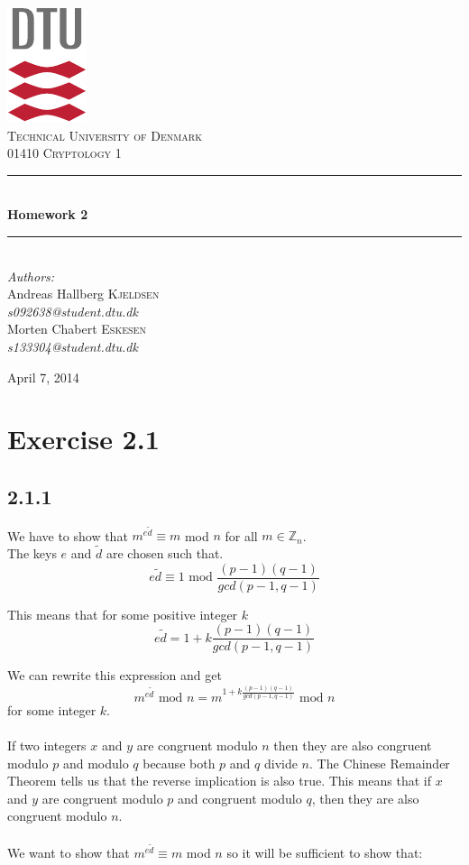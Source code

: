 \documentclass[11pt]{report}
\newcommand{\HRule}{\rule{\linewidth}{0.5mm}}
\begin{document}
\begin{titlepage}
\begin{center}

\includegraphics[scale=2.0]{../GFX/dtu_logo.pdf}\\[1cm]
\textsc{\LARGE Technical University of Denmark}\\[1.5cm]
\textsc{\Large 01410 Cryptology 1}\\[0.5cm]

\HRule \\[0.4cm]
{\huge \bfseries Homework 2}\\[0.1cm]
\HRule \\[1.5cm]

{\large
\emph{Authors:} \\[10pt]
Andreas Hallberg \textsc{Kjeldsen}\\
\emph{s092638@student.dtu.dk} \\[10pt]
Morten Chabert \textsc{Eskesen}\\
\emph{s133304@student.dtu.dk}
}
\vfill

{\large April 7, 2014}

\end{center}
\end{titlepage}

\section*{Exercise 2.1}
\subsection*{2.1.1}
We have to show that $m^{e\tilde{d}} \equiv m$ mod $n$ for all $m \in \mathbb{Z}_{n}$.\\
The keys $e$ and $\tilde{d}$ are chosen such that.
$$e\tilde{d} \equiv 1 \text{ mod } \frac{(p-1)(q-1)}{gcd(p-1,q-1)}$$

This means that for some positive integer $k$
$$e\tilde{d} = 1 + k\frac{(p-1)(q-1)}{gcd(p-1,q-1)}$$

We can rewrite this expression and get
$$m^{e\tilde{d}} \text{ mod } n = m^{1+k\frac{(p-1)(q-1)}{gcd(p-1,q-1)}}  \text{ mod } n$$
for some integer $k$.\\
\\
If two integers $x$ and $y$ are congruent modulo $n$ then they are also congruent modulo $p$ and modulo $q$ because both $p$ and $q$ divide $n$. The Chinese Remainder Theorem tells us that the reverse implication is also true. This means that if $x$ and $y$ are congruent modulo $p$ and congruent modulo $q$, then they are also congruent modulo $n$.\\
\\
We want to show that $m^{e\tilde{d}} \equiv m$ mod $n$ so it will be sufficient to show that:
\end{document}

